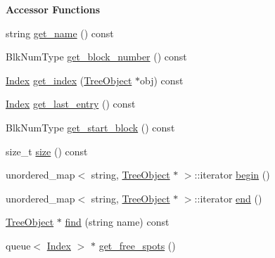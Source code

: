 \begin{Indent}\textbf{ Accessor Functions}\par
\begin{DoxyCompactItemize}
\item 
string \mbox{\hyperlink{classTreeObject_a5216922ec0b98bcc375601db8d253770}{get\+\_\+name}} () const
\item 
Blk\+Num\+Type \mbox{\hyperlink{classTreeObject_af7841065fe85d0884341d72669185169}{get\+\_\+block\+\_\+number}} () const
\item 
\mbox{\hyperlink{structindex}{Index}} \mbox{\hyperlink{classTreeObject_ae0983a3ff99d413e22beaaac8d7b6d12}{get\+\_\+index}} (\mbox{\hyperlink{classTreeObject}{Tree\+Object}} $\ast$obj) const
\item 
\mbox{\hyperlink{structindex}{Index}} \mbox{\hyperlink{classTreeObject_a2d7c1a4c2d36c81110ccae09d9724125}{get\+\_\+last\+\_\+entry}} () const
\item 
Blk\+Num\+Type \mbox{\hyperlink{classTreeObject_a16153734dbee4adc99fa195715728c2f}{get\+\_\+start\+\_\+block}} () const
\item 
size\+\_\+t \mbox{\hyperlink{classTreeObject_a2a3dffe29aba8965c7977312c3721b50}{size}} () const
\item 
unordered\+\_\+map$<$ string, \mbox{\hyperlink{classTreeObject}{Tree\+Object}} $\ast$ $>$\+::iterator \mbox{\hyperlink{classTreeObject_af8bb5e54c0a13e1e0e5be409153ab6d8}{begin}} ()
\item 
unordered\+\_\+map$<$ string, \mbox{\hyperlink{classTreeObject}{Tree\+Object}} $\ast$ $>$\+::iterator \mbox{\hyperlink{classTreeObject_a2544e2976f3b75cd1f0230f5f908059c}{end}} ()
\item 
\mbox{\hyperlink{classTreeObject}{Tree\+Object}} $\ast$ \mbox{\hyperlink{classTreeObject_a6a7477c29a06a9896df549f83611252f}{find}} (string name) const
\item 
queue$<$ \mbox{\hyperlink{structindex}{Index}} $>$ $\ast$ \mbox{\hyperlink{classTreeObject_aa0900ad50c10023e4700f11218d30d7a}{get\+\_\+free\+\_\+spots}} ()
\end{DoxyCompactItemize}
\end{Indent}

